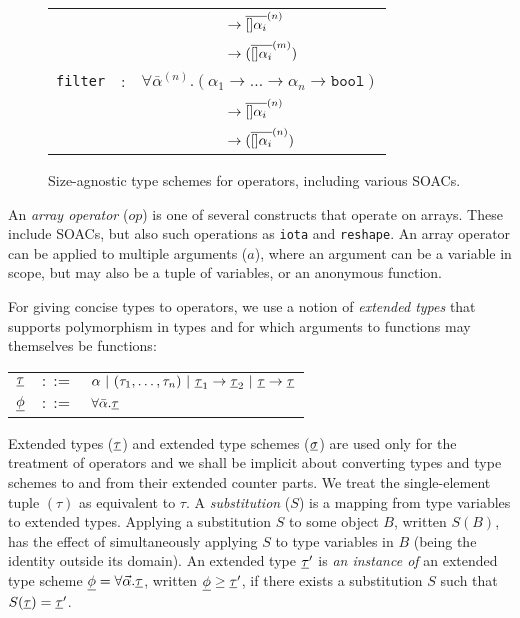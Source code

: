 \begin{figure}[hbt]
\begin{tabular}{lcl}
          & & ~~~~~~~~~~ $\rightarrow \overline{[]\alpha_i}^{(n)}$\\
          & & ~~~~~~~~~~ $\rightarrow (\overline{[]\alpha_i}^{(m)})$ \\
  {\lstinline!filter!} & : & $\forall\bar{\alpha}^{(n)}.(\alpha_1 \rightarrow \ldots \rightarrow \alpha_n \rightarrow \texttt{bool})$ \\
          & & ~~~~~~~~~~ $\rightarrow \overline{[]\alpha_i}^{(n)}$ \\
          & & ~~~~~~~~~~ $\rightarrow (\overline{[]\alpha_i}^{(n)})$ \\
\end{tabular}
\caption{Size-agnostic type schemes for operators, including various SOACs.}
\label{fig:soacType}
\end{figure}

An \textit{array operator} ($op$) is one of several constructs that
operate on arrays.  These include SOACs, but also such operations as
\lstinline{iota} and \lstinline{reshape}.  An array operator can be
applied to multiple arguments ($a$), where an argument can be a
variable in scope, but may also be a tuple of variables, or an
anonymous function.

For giving concise types to operators, we use a notion of \emph{extended
types} that supports polymorphism in types and for which arguments to
functions may themselves be functions:

\begin{tabular}{lrl}
$\underline{\tau}$ & $::=$ & $\alpha~|~(\tau_{1}, \ldots, \tau_{n})~|~\underline{\tau}_1 \rightarrow \underline{\tau}_2~|~\underline{\tau} \rightarrow \underline{\tau}$ \\
$\underline{\phi}$ & $::=$ & $\forall\bar{\alpha}.\underline{\tau}$
\end{tabular}

\noindent Extended types ($\underline{\tau}$) and extended type schemes
($\underline{\sigma}$) are used only for the treatment of operators and we
shall be implicit about converting types and type schemes to and from
their extended counter parts.  We treat the single-element tuple
$(\tau)$ as equivalent to $\tau$.  A \emph{substitution} ($S$) is a
mapping from type variables to extended types. Applying a substitution
$S$ to some object $B$, written $S(B)$, has the effect of
simultaneously applying $S$ to type variables in $B$ (being the
identity outside its domain). An extended type $\underline{\tau}'$ is \emph{an
  instance of} an extended type scheme
$\underline{\phi} = \forall \vec{\alpha}.\underline{\tau}$, written $\underline{\phi} \geq \underline{\tau}'$,
if there exists a substitution $S$ such that $S(\underline{\tau}) = \underline{\tau}'$.

